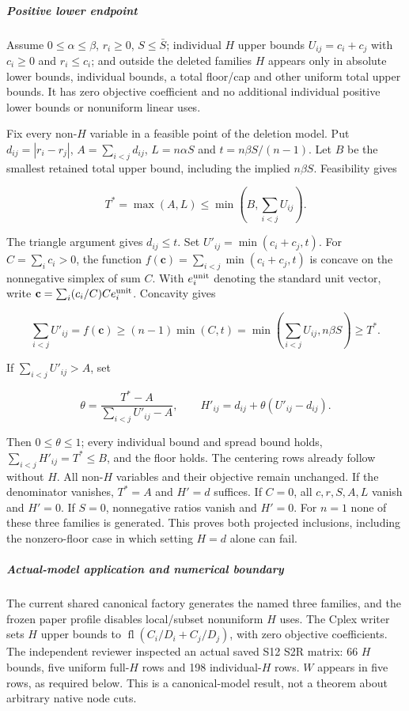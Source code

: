 \documentclass[
  american,
  11pt,
]{article}
\newcounter{none} %
\begin{document}
\subparagraph{Positive lower endpoint}\label{positive-lower-endpoint}

Assume \(0\le\alpha\le\beta\), \(r_i\ge0\), \(S\le\bar S\); individual
\(H\) upper bounds \(U_{ij}=c_i+c_j\) with \(c_i\ge0\) and
\(r_i\le c_i\); and outside the deleted families \(H\) appears only in
absolute lower bounds, individual bounds, a total floor/cap and other
uniform total upper bounds. It has zero objective coefficient and no
additional individual positive lower bounds or nonuniform linear uses.

Fix every non-\(H\) variable in a feasible point of the deletion model.
Put \(d_{ij}=|r_i-r_j|\), \(A=\sum_{i<j}d_{ij}\), \(L=n\alpha S\) and
\(t=n\beta S/(n-1)\). Let \(B\) be the smallest retained total upper
bound, including the implied \(n\beta S\). Feasibility gives

\[
T^*=\max(A,L)\le\min\left(B,\sum_{i<j}U_{ij}\right).
\]

The triangle argument gives \(d_{ij}\le t\). Set
\(U'_{ij}=\min(c_i+c_j,t)\). For \(C=\sum_i c_i>0\), the function
\(f(\mathbf c)=\sum_{i<j}\min(c_i+c_j,t)\) is concave on the nonnegative
simplex of sum \(C\). With \(e_i^{\rm unit}\) denoting the standard unit
vector, write \(\mathbf c=\sum_i(c_i/C)C e_i^{\rm unit}\). Concavity
gives

\[
\sum_{i<j}U'_{ij}=f(\mathbf c)\ge(n-1)\min(C,t)
=\min\left(\sum_{i<j}U_{ij},n\beta S\right)\ge T^*.
\]

If \(\sum_{i<j}U'_{ij}>A\), set

\[
\theta=\frac{T^*-A}{\sum_{i<j}U'_{ij}-A},\qquad
H'_{ij}=d_{ij}+\theta(U'_{ij}-d_{ij}).
\]

Then \(0\le\theta\le1\); every individual bound and spread bound holds,
\(\sum_{i<j}H'_{ij}=T^*\le B\), and the floor holds. The centering rows
already follow without \(H\). All non-\(H\) variables and their
objective remain unchanged. If the denominator vanishes, \(T^*=A\) and
\(H'=d\) suffices. If \(C=0\), all \(c,r,S,A,L\) vanish and \(H'=0\). If
\(S=0\), nonnegative ratios vanish and \(H'=0\). For \(n=1\) none of
these three families is generated. This proves both projected
inclusions, including the nonzero-floor case in which setting \(H=d\)
alone can fail.

\subparagraph{Actual-model application and numerical
boundary}\label{actual-model-application-and-numerical-boundary}

The current shared canonical factory generates the named three families,
and the frozen paper profile disables local/subset nonuniform \(H\)
uses. The Cplex writer sets \(H\) upper bounds to
\(\operatorname{fl}(C_i/D_i+C_j/D_j)\), with zero objective
coefficients. The independent reviewer inspected an actual saved S12 S2R
matrix: 66 \(H\) bounds, five uniform full-\(H\) rows and 198
individual-\(H\) rows. \(W\) appears in five rows, as required below.
This is a canonical-model result, not a theorem about arbitrary native
node cuts.
\end{document}
